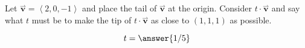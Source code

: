 \documentclass{ximera}
\author{Bart Snapp}
\begin{document}
\begin{exercise}
Let $\overset{\boldsymbol{\rightharpoonup}}{\mathbf{v}} = \left< 2,0,-1 \right>$ and place the tail of $\overset{\boldsymbol{\rightharpoonup}}{\mathbf{v}}$ at the
  origin. Consider $t\cdot \overset{\boldsymbol{\rightharpoonup}}{\mathbf{v}}$ and say what $t$ must be to make
  the tip of $t\cdot \overset{\boldsymbol{\rightharpoonup}}{\mathbf{v}}$ as close to $(1,1,1)$ as possible.
  \begin{prompt}
    \[
    t=\answer{1/5}
    \]
  \end{prompt}
\end{exercise}
\end{document}
